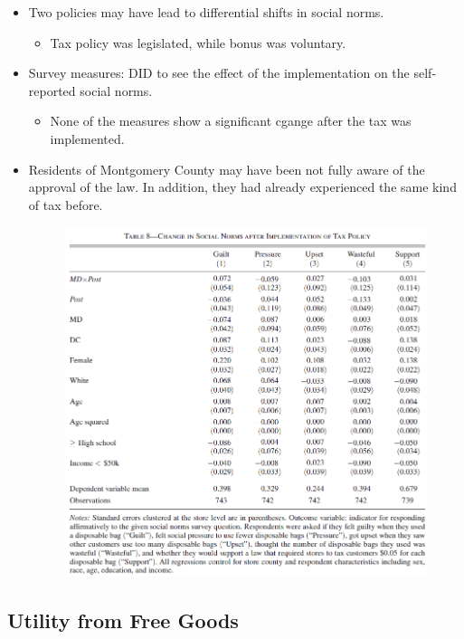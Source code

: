 \documentclass[../root]{subfiles}
\begin{document}
    \begin{itemize}
      \item Two policies may have lead to differential shifts in social norms.
      \begin{itemize}
        \item Tax policy was legislated, while bonus was voluntary.
      \end{itemize}
      \item Survey measures: DID to see the effect of the implementation on the self-reported social norms.
      \begin{itemize}
        \item None of the measures show a significant cgange after the tax was implemented.
      \end{itemize}
      \item Residents of Montgomery County may have been not fully aware of the approval of the law. In addition, they had already experienced the same kind of tax before.
      \begin{figure}[ht]
        \centering
        \includegraphics[scale = .8]{0807tanji/T8}
      \end{figure}
    \end{itemize}

    \subsection{Utility from Free Goods}
\end{document}
